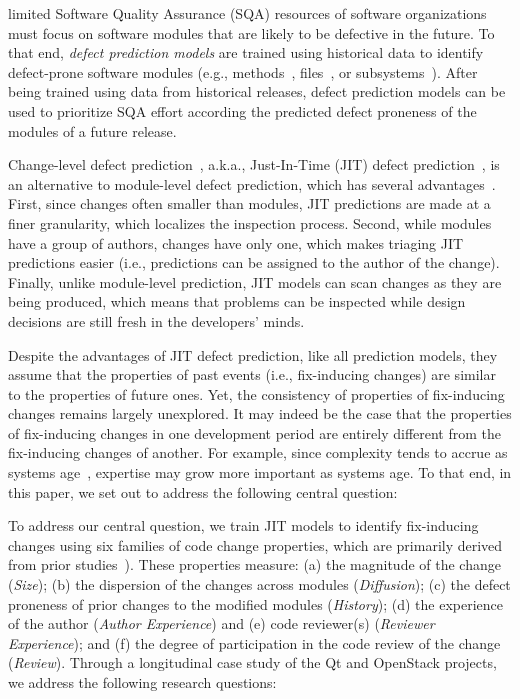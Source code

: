 \label{sec:intro}

 limited Software Quality Assurance (SQA) resources of software organizations must focus on software modules that are likely to be defective in the future.
To that end, {\em defect prediction models} are trained using historical data to identify defect-prone software modules (e.g., methods~\cite{giger2012esem, hata2012icse}, files~\cite{zimmerman2007}, or subsystems~\cite{nagappan2005icse}).
After being trained using data from historical releases, defect prediction models can be used to prioritize SQA effort according the predicted defect proneness of the modules of a future release.

Change-level defect prediction~\cite{mockus2000bell}, a.k.a., Just-In-Time (JIT) defect prediction~\cite{kamei2013tse}, is an alternative to module-level defect prediction, which has several advantages~\cite{shihab2012fse}.
First, since changes often smaller than modules, JIT predictions are made at a finer granularity, which localizes the inspection process.
Second, while modules have a group of authors, changes have only one, which makes triaging JIT predictions easier (i.e., predictions can be assigned to the author of the change).
Finally, unlike module-level prediction, JIT models can scan changes as they are being produced, which means that problems can be inspected while design decisions are still fresh in the developers' minds.

Despite the advantages of JIT defect prediction, like all prediction models, they assume that the properties of past events (i.e., fix-inducing changes) are similar to the properties of future ones.
Yet, the consistency of properties of fix-inducing changes remains largely unexplored.
It may indeed be the case that the properties of fix-inducing changes in one development period are entirely different from the fix-inducing changes of another.
For example, since complexity tends to accrue as systems age~\cite{belady1976}, expertise may grow more important as systems age.
To that end, in this paper, we set out to address the following central question:

\conjecture

To address our central question, we train JIT models to identify fix-inducing changes using six families of code change properties, which are primarily derived from prior studies~\cite{mockus2000bell, kim2008tse, kamei2013tse, kononenko2015icsme}).
These properties measure:
(a) the magnitude of the change ({\em Size});
(b) the dispersion of the changes across modules ({\em Diffusion});
(c) the defect proneness of prior changes to the modified modules ({\em History});
(d) the experience of the author ({\em Author Experience}) and
(e) code reviewer(s) ({\em Reviewer Experience});
and (f) the degree of participation in the code review of the change ({\em Review}).
Through a longitudinal case study of the {\sc Qt} and {\sc OpenStack} projects, we address the following research questions:


